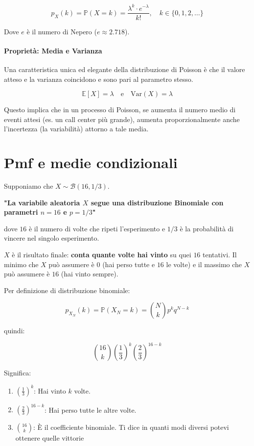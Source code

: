 \begin{equation}
\boxed{p_X(k) = \mathbb{P}(X=k) = \frac{\lambda^k \cdot e^{-\lambda}}{k!}, \quad k \in \{0, 1, 2, \dots\}}
\end{equation}

Dove $e$ è il numero di Nepero ($e \approx 2.718$).

\paragraph{Proprietà: Media e Varianza}
Una caratteristica unica ed elegante della distribuzione di Poisson è che il valore atteso e la varianza coincidono e sono pari al parametro stesso.

\begin{equation}
\mathbb{E}[X] = \lambda \quad \text{e} \quad \text{Var}(X) = \lambda
\end{equation}

Questo implica che in un processo di Poisson, se aumenta il numero medio di eventi attesi (es. un call center più grande), aumenta proporzionalmente anche l'incertezza (la variabilità) attorno a tale media.

\section{Pmf e medie condizionali}

Supponiamo che $X \sim \mathcal{B}(16, 1/3)$.

\textbf{"La variabile aleatoria $X$ segue una distribuzione Binomiale con parametri $n= 16$ e $p=1/3$"}

dove $16$ è il numero di volte che ripeti l'esperimento e $1/3$ è la probabilità di vincere nel singolo esperimento.

$X$ è il risultato finale: \textbf{conta quante volte hai vinto} su quei $16$ tentativi. Il minimo che $X$ può assumere è $0$ (hai perso tutte e $16$ le volte) e il massimo che $X$ può assumere è $16$ (hai vinto sempre).

Per definizione di distribuzione binomiale:

\begin{equation}
\boxed{p_{X_N}(k) = \mathbb{P}(X_N = k) = \binom{N}{k} p^k q^{N-k}}
\end{equation}

quindi:

\[
\binom{16}{k} \left(\frac{1}{3}\right)^k \left(\frac{2}{3}\right)^{16-k}
\]

Significa:
\begin{enumerate}
    \item $\left(\frac{1}{3}\right)^k$: Hai vinto $k$ volte.
    \item $\left(\frac{2}{3}\right)^{16-k}$: Hai perso tutte le altre volte.
    \item $\binom{16}{k}$: È il coefficiente binomiale. Ti dice in quanti modi diversi potevi ottenere quelle vittorie 
\end{enumerate}

